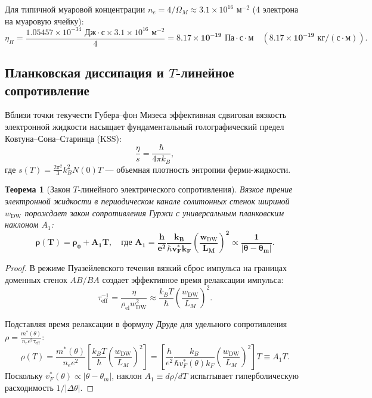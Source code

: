 \documentclass[12pt,a4paper]{article}
\newtheorem{theorem}{Теорема}
\begin{document}
Для типичной муаровой концентрации $n_e = 4 / \Omega_M \approx 3.1 \times 10^{16}\text{ м}^{-2}$ (4 электрона на муаровую ячейку):
\begin{equation}
	\eta_H = \frac{1.05457 \times 10^{-34}\text{ Дж}\cdot\text{с} \times 3.1 \times 10^{16}\text{ м}^{-2}}{4} = \mathbf{8.17 \times 10^{-19}\text{ Па}\cdot\text{с}\cdot\text{м}} \quad (\mathbf{8.17 \times 10^{-19}\text{ кг}/(\text{с}\cdot\text{м})}).
\end{equation}

\subsection{Планковская диссипация и $T$-линейное сопротивление}
Вблизи точки текучести Губера--фон Мизеса эффективная сдвиговая вязкость электронной жидкости насыщает фундаментальный голографический предел Ковтуна--Сона--Старинца (KSS):
\begin{equation}
	\frac{\eta}{s} = \frac{\hbar}{4\pi k_B},
\end{equation}
где $s(T) = \frac{2\pi^2}{3} k_B^2 N(0) T$ — объемная плотность энтропии ферми-жидкости.

\begin{theorem}[Закон $T$-линейного электрического сопротивления]
	Вязкое трение электронной жидкости в периодическом канале солитонных стенок шириной $w_{\mathrm{DW}}$ порождает закон сопротивления Гуржи с универсальным планковским наклоном $A_1$:
	\begin{equation}
		\mathbf{\rho(T) = \rho_0 + A_1 T}, \quad \text{где } \mathbf{A_1 = \frac{h}{e^2} \frac{k_B}{\hbar v_F^* k_F} \left( \frac{w_{\mathrm{DW}}}{L_M} \right)^2 \propto \frac{1}{|\theta - \theta_m|}}.
	\end{equation}
\end{theorem}

\begin{proof}
	В режиме Пуазейлевского течения вязкий сброс импульса на границах доменных стенок $AB/BA$ создает эффективное время релаксации импульса:
	\begin{equation}
		\tau_{\text{eff}}^{-1} = \frac{\eta}{\rho_{\text{el}} w_{\text{DW}}^2} \approx \frac{k_B T}{\hbar} \left( \frac{w_{\text{DW}}}{L_M} \right)^2.
	\end{equation}
	
	Подставляя время релаксации в формулу Друде для удельного сопротивления $\rho = \frac{m^*(\theta)}{n_e e^2 \tau_{\text{eff}}}$:
	\begin{equation}
		\rho(T) = \frac{m^*(\theta)}{n_e e^2} \left[ \frac{k_B T}{\hbar} \left( \frac{w_{\text{DW}}}{L_M} \right)^2 \right] = \left[ \frac{h}{e^2} \frac{k_B}{\hbar v_F^*(\theta) k_F} \left( \frac{w_{\text{DW}}}{L_M} \right)^2 \right] T \equiv A_1 T.
	\end{equation}
	Поскольку $v_F^*(\theta) \propto |\theta - \theta_m|$, наклон $A_1 \equiv d\rho/dT$ испытывает гиперболическую расходимость $1/|\Delta \theta|$.
\end{proof}
\end{document}
